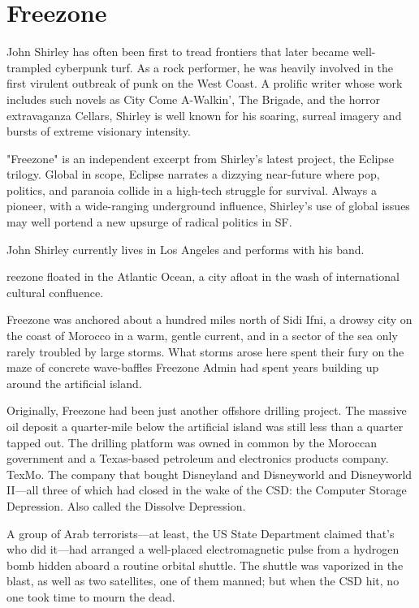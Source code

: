 \chapter{Freezone}

John Shirley has often been first to tread frontiers that later became well-trampled cyberpunk turf. As a rock performer, he was heavily involved in the first virulent outbreak of punk on the West Coast. A prolific writer whose work includes such novels as City Come A-Walkin', The Brigade, and the horror extravaganza Cellars, Shirley is well known for his soaring, surreal imagery and bursts of extreme visionary intensity.

"Freezone" is an independent excerpt from Shirley's latest project, the Eclipse trilogy. Global in scope, Eclipse narrates a dizzying near-future where pop, politics, and paranoia collide in a high-tech struggle for survival. Always a pioneer, with a wide-ranging underground influence, Shirley's use of global issues may well portend a new upsurge of radical politics in SF.

John Shirley currently lives in Los Angeles and performs with his band.

\hrulefill

reezone floated in the Atlantic Ocean, a city afloat in the wash of international cultural confluence.

Freezone was anchored about a hundred miles north of Sidi Ifni, a drowsy city on the coast of Morocco in a warm, gentle current, and in a sector of the sea only rarely troubled by large storms. What storms arose here spent their fury on the maze of concrete wave-baffles Freezone Admin had spent years building up around the artificial island.

Originally, Freezone had been just another offshore drilling project. The massive oil deposit a quarter-mile below the artificial island was still less than a quarter tapped out. The drilling platform was owned in common by the Moroccan government and a Texas-based petroleum and electronics products company. TexMo. The company that bought Disneyland and Disneyworld and Disneyworld II—all three of which had closed in the wake of the CSD: the Computer Storage Depression. Also called the Dissolve Depression.

A group of Arab terrorists—at least, the US State Department claimed that's who did it—had arranged a well-placed electromagnetic pulse from a hydrogen bomb hidden aboard a routine orbital shuttle. The shuttle was vaporized in the blast, as well as two satellites, one of them manned; but when the CSD hit, no one took time to mourn the dead.

